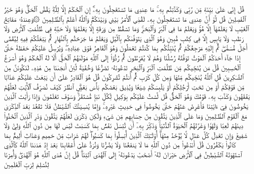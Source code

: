 قُلۡ إِنِّي عَلَىٰ بَيِّنَةٖ مِّن رَّبِّي وَكَذَّبۡتُم بِهِۦۚ مَا عِندِي مَا تَسۡتَعۡجِلُونَ بِهِۦٓۚ إِنِ ٱلۡحُكۡمُ إِلَّا لِلَّهِۖ يَقُصُّ ٱلۡحَقَّۖ وَهُوَ خَيۡرُ ٱلۡفَٰصِلِينَ
قُل لَّوۡ أَنَّ عِندِي مَا تَسۡتَعۡجِلُونَ بِهِۦ لَقُضِيَ ٱلۡأَمۡرُ بَيۡنِي وَبَيۡنَكُمۡۗ وَٱللَّهُ أَعۡلَمُ بِٱلظَّـٰلِمِينَ
۞وَعِندَهُۥ مَفَاتِحُ ٱلۡغَيۡبِ لَا يَعۡلَمُهَآ إِلَّا هُوَۚ وَيَعۡلَمُ مَا فِي ٱلۡبَرِّ وَٱلۡبَحۡرِۚ وَمَا تَسۡقُطُ مِن وَرَقَةٍ إِلَّا يَعۡلَمُهَا وَلَا حَبَّةٖ فِي ظُلُمَٰتِ ٱلۡأَرۡضِ وَلَا رَطۡبٖ وَلَا يَابِسٍ إِلَّا فِي كِتَٰبٖ مُّبِينٖ
وَهُوَ ٱلَّذِي يَتَوَفَّىٰكُم بِٱلَّيۡلِ وَيَعۡلَمُ مَا جَرَحۡتُم بِٱلنَّهَارِ ثُمَّ يَبۡعَثُكُمۡ فِيهِ لِيُقۡضَىٰٓ أَجَلٞ مُّسَمّٗىۖ ثُمَّ إِلَيۡهِ مَرۡجِعُكُمۡ ثُمَّ يُنَبِّئُكُم بِمَا كُنتُمۡ تَعۡمَلُونَ
وَهُوَ ٱلۡقَاهِرُ فَوۡقَ عِبَادِهِۦۖ وَيُرۡسِلُ عَلَيۡكُمۡ حَفَظَةً حَتَّىٰٓ إِذَا جَآءَ أَحَدَكُمُ ٱلۡمَوۡتُ تَوَفَّتۡهُ رُسُلُنَا وَهُمۡ لَا يُفَرِّطُونَ
ثُمَّ رُدُّوٓاْ إِلَى ٱللَّهِ مَوۡلَىٰهُمُ ٱلۡحَقِّۚ أَلَا لَهُ ٱلۡحُكۡمُ وَهُوَ أَسۡرَعُ ٱلۡحَٰسِبِينَ
قُلۡ مَن يُنَجِّيكُم مِّن ظُلُمَٰتِ ٱلۡبَرِّ وَٱلۡبَحۡرِ تَدۡعُونَهُۥ تَضَرُّعٗا وَخُفۡيَةٗ لَّئِنۡ أَنجَىٰنَا مِنۡ هَٰذِهِۦ لَنَكُونَنَّ مِنَ ٱلشَّـٰكِرِينَ
قُلِ ٱللَّهُ يُنَجِّيكُم مِّنۡهَا وَمِن كُلِّ كَرۡبٖ ثُمَّ أَنتُمۡ تُشۡرِكُونَ
قُلۡ هُوَ ٱلۡقَادِرُ عَلَىٰٓ أَن يَبۡعَثَ عَلَيۡكُمۡ عَذَابٗا مِّن فَوۡقِكُمۡ أَوۡ مِن تَحۡتِ أَرۡجُلِكُمۡ أَوۡ يَلۡبِسَكُمۡ شِيَعٗا وَيُذِيقَ بَعۡضَكُم بَأۡسَ بَعۡضٍۗ ٱنظُرۡ كَيۡفَ نُصَرِّفُ ٱلۡأٓيَٰتِ لَعَلَّهُمۡ يَفۡقَهُونَ
وَكَذَّبَ بِهِۦ قَوۡمُكَ وَهُوَ ٱلۡحَقُّۚ قُل لَّسۡتُ عَلَيۡكُم بِوَكِيلٖ
لِّكُلِّ نَبَإٖ مُّسۡتَقَرّٞۚ وَسَوۡفَ تَعۡلَمُونَ
وَإِذَا رَأَيۡتَ ٱلَّذِينَ يَخُوضُونَ فِيٓ ءَايَٰتِنَا فَأَعۡرِضۡ عَنۡهُمۡ حَتَّىٰ يَخُوضُواْ فِي حَدِيثٍ غَيۡرِهِۦۚ وَإِمَّا يُنسِيَنَّكَ ٱلشَّيۡطَٰنُ فَلَا تَقۡعُدۡ بَعۡدَ ٱلذِّكۡرَىٰ مَعَ ٱلۡقَوۡمِ ٱلظَّـٰلِمِينَ
وَمَا عَلَى ٱلَّذِينَ يَتَّقُونَ مِنۡ حِسَابِهِم مِّن شَيۡءٖ وَلَٰكِن ذِكۡرَىٰ لَعَلَّهُمۡ يَتَّقُونَ
وَذَرِ ٱلَّذِينَ ٱتَّخَذُواْ دِينَهُمۡ لَعِبٗا وَلَهۡوٗا وَغَرَّتۡهُمُ ٱلۡحَيَوٰةُ ٱلدُّنۡيَاۚ وَذَكِّرۡ بِهِۦٓ أَن تُبۡسَلَ نَفۡسُۢ بِمَا كَسَبَتۡ لَيۡسَ لَهَا مِن دُونِ ٱللَّهِ وَلِيّٞ وَلَا شَفِيعٞ وَإِن تَعۡدِلۡ كُلَّ عَدۡلٖ لَّا يُؤۡخَذۡ مِنۡهَآۗ أُوْلَـٰٓئِكَ ٱلَّذِينَ أُبۡسِلُواْ بِمَا كَسَبُواْۖ لَهُمۡ شَرَابٞ مِّنۡ حَمِيمٖ وَعَذَابٌ أَلِيمُۢ بِمَا كَانُواْ يَكۡفُرُونَ
قُلۡ أَنَدۡعُواْ مِن دُونِ ٱللَّهِ مَا لَا يَنفَعُنَا وَلَا يَضُرُّنَا وَنُرَدُّ عَلَىٰٓ أَعۡقَابِنَا بَعۡدَ إِذۡ هَدَىٰنَا ٱللَّهُ كَٱلَّذِي ٱسۡتَهۡوَتۡهُ ٱلشَّيَٰطِينُ فِي ٱلۡأَرۡضِ حَيۡرَانَ لَهُۥٓ أَصۡحَٰبٞ يَدۡعُونَهُۥٓ إِلَى ٱلۡهُدَى ٱئۡتِنَاۗ قُلۡ إِنَّ هُدَى ٱللَّهِ هُوَ ٱلۡهُدَىٰۖ وَأُمِرۡنَا لِنُسۡلِمَ لِرَبِّ ٱلۡعَٰلَمِينَ
